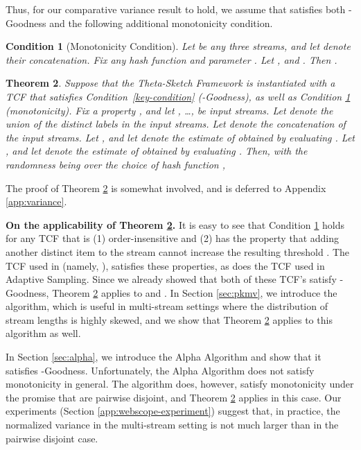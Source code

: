 \documentclass{article}
\newcommand{\edit}[1]{{#1}}
\newtheorem{theorem}{Theorem}[section]
\newtheorem{condition}[theorem]{Condition}
\begin{document}
Thus, for our comparative variance result to hold, we assume that  satisfies both -Goodness and the following additional monotonicity condition.


\begin{condition}[Monotonicity Condition] \label{mildcondition}
Let  be any three streams, and let  denote their concatenation. Fix any hash function  and parameter . Let , and . Then . 
\end{condition}
\begin{theorem} \label{thm:variance}
Suppose that the Theta-Sketch Framework is instantiated with a TCF  that satisfies Condition~\ref{key-condition} (-Goodness), as well as Condition \ref{mildcondition} (monotonicity). Fix a property , and
 let ,
\ldots , be  input streams.  Let  denote the union of the distinct labels in the input streams.
Let  denote the concatenation of the input streams.
Let , and let   denote the 
estimate of  obtained by 
evaluating .
Let , and 
let  
denote the estimate of  obtained by 
evaluating .
Then, with the randomness being over the choice of hash function ,

\end{theorem}
The proof of Theorem \ref{thm:variance} is somewhat involved, and is deferred to Appendix \ref{app:variance}. 

\medskip
\noindent \textbf{On the applicability of Theorem \ref{thm:variance}.}
\label{sec:applicability}
It is easy to see that Condition \ref{mildcondition} holds for any TCF that is (1) order-insensitive and (2)
has the property that adding another distinct item to the stream cannot increase the resulting threshold .
The TCF  used in  (namely, ), satisfies these properties, as does
the TCF used in Adaptive Sampling. Since we already showed that both of these TCF's satisfy -Goodness, Theorem \ref{thm:variance} applies
to  and .
In Section \ref{sec:pkmv}, we introduce the  algorithm, which is useful in multi-stream settings where the distribution of stream lengths is highly skewed, and we
show that Theorem \ref{thm:variance} applies to this algorithm as well. 



In Section \ref{sec:alpha},
we introduce the Alpha Algorithm and show that it satisfies -Goodness. Unfortunately, the Alpha Algorithm 
does not satisfy monotonicity in general. 
The algorithm does, however, satisfy monotonicity under the promise that  are pairwise disjoint, and Theorem \ref{thm:variance} applies in this case. 
Our experiments (Section \ref{app:webscope-experiment}) suggest that, in practice, the \edit{normalized} 
variance in the multi-stream setting is not much larger than in the pairwise disjoint case.
\end{document}
